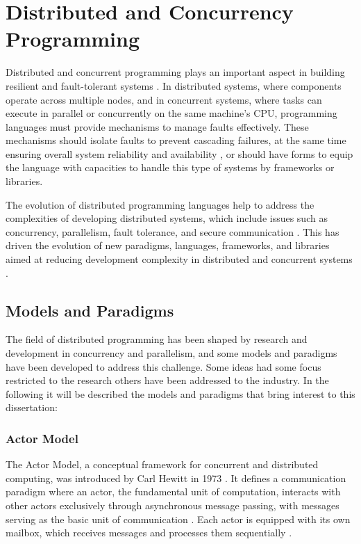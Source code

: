 

\section{Distributed and Concurrency Programming}

Distributed and concurrent programming plays an important aspect in building resilient and fault-tolerant systems \cite{Armstrong2013}. In distributed systems, where components operate across multiple nodes, and in concurrent systems, where tasks can execute in parallel or concurrently on the same machine's \gls{CPU}, programming languages must provide mechanisms to manage faults effectively. These mechanisms should isolate faults to prevent cascading failures, at the same time ensuring overall system reliability and availability \cite{Nystrom2009}, or should have forms to equip the language with capacities to handle this type of systems by frameworks or libraries.

The evolution of distributed programming languages help to address the complexities of developing distributed systems, which include issues such as concurrency, parallelism, fault tolerance, and secure communication \cite{Armstrong2013}. This has driven the evolution of new paradigms, languages, frameworks, and libraries aimed at reducing development complexity in distributed and concurrent systems \cite{Valkov2018}.

\subsection{Models and Paradigms}

The field of distributed programming has been shaped by research and development in concurrency and parallelism, and some models and paradigms have been developed to address this challenge. Some ideas had some focus restricted to the research others have been addressed to the industry. In the following it will be described the models and paradigms that bring interest to this dissertation:

\subsubsection{Actor Model}

The Actor Model, a conceptual framework for concurrent and distributed computing, was introduced by Carl Hewitt in 1973 \cite{Hewitt1973}. It defines a communication paradigm where an actor, the fundamental unit of computation, interacts with other actors exclusively through asynchronous message passing, with messages serving as the basic unit of communication \cite{Trinder2017}. Each actor is equipped with its own mailbox, which receives messages and processes them sequentially \cite{Koster2016}.

